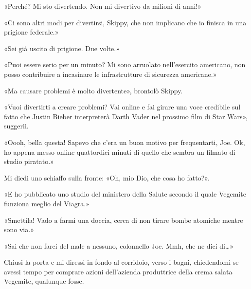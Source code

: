 «Perché? Mi sto divertendo. Non mi divertivo da milioni di anni!»

«Ci sono altri modi per divertirsi, Skippy, che non implicano che io
finisca in una prigione federale.»

«Sei già uscito di prigione. Due volte.»

«Puoi essere serio per un minuto? Mi sono arruolato nell'esercito
americano, non posso contribuire a incasinare le infrastrutture di
sicurezza americane.»

«Ma causare problemi è molto divertente», brontolò Skippy.

«Vuoi divertirti a creare problemi? Vai online e fai girare una voce
credibile sul fatto che Justin Bieber interpreterà Darth Vader nel
prossimo film di Star Wars», suggerii.

«Oooh, bella questa! Sapevo che c'era un buon motivo per frequentarti,
Joe. Ok, ho appena messo online quattordici minuti di quello che sembra
un filmato di studio piratato.»

Mi diedi uno schiaffo sulla fronte: «Oh, mio Dio, che cosa ho fatto?».

«E ho pubblicato uno studio del ministero della Salute secondo il quale
Vegemite funziona meglio del Viagra.»

«Smettila! Vado a farmi una doccia, cerca di non tirare bombe atomiche
mentre sono via.»

«Sai che non farei del male a nessuno, colonnello Joe. Mmh, che ne dici
di\ldots»

Chiusi la porta e mi diressi in fondo al corridoio, verso i bagni,
chiedendomi se avessi tempo per comprare azioni dell'azienda produttrice
della crema salata Vegemite, qualunque fosse.

\hfill\break

